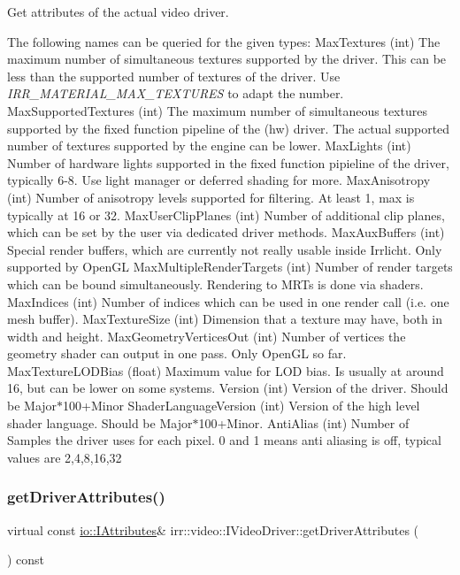Get attributes of the actual video driver. 

The following names can be queried for the given types\+: Max\+Textures (int) The maximum number of simultaneous textures supported by the driver. This can be less than the supported number of textures of the driver. Use {\itshape I\+R\+R\+\_\+\+M\+A\+T\+E\+R\+I\+A\+L\+\_\+\+M\+A\+X\+\_\+\+T\+E\+X\+T\+U\+R\+ES} to adapt the number. Max\+Supported\+Textures (int) The maximum number of simultaneous textures supported by the fixed function pipeline of the (hw) driver. The actual supported number of textures supported by the engine can be lower. Max\+Lights (int) Number of hardware lights supported in the fixed function pipieline of the driver, typically 6-\/8. Use light manager or deferred shading for more. Max\+Anisotropy (int) Number of anisotropy levels supported for filtering. At least 1, max is typically at 16 or 32. Max\+User\+Clip\+Planes (int) Number of additional clip planes, which can be set by the user via dedicated driver methods. Max\+Aux\+Buffers (int) Special render buffers, which are currently not really usable inside Irrlicht. Only supported by Open\+GL Max\+Multiple\+Render\+Targets (int) Number of render targets which can be bound simultaneously. Rendering to M\+R\+Ts is done via shaders. Max\+Indices (int) Number of indices which can be used in one render call (i.\+e. one mesh buffer). Max\+Texture\+Size (int) Dimension that a texture may have, both in width and height. Max\+Geometry\+Vertices\+Out (int) Number of vertices the geometry shader can output in one pass. Only Open\+GL so far. Max\+Texture\+L\+O\+D\+Bias (float) Maximum value for L\+OD bias. Is usually at around 16, but can be lower on some systems. Version (int) Version of the driver. Should be Major$\ast$100+\+Minor Shader\+Language\+Version (int) Version of the high level shader language. Should be Major$\ast$100+\+Minor. Anti\+Alias (int) Number of Samples the driver uses for each pixel. 0 and 1 means anti aliasing is off, typical values are 2,4,8,16,32 \mbox{\label{classirr_1_1video_1_1IVideoDriver_a2b43d2215f2e5aad9b4f92aa635bcc85}} 
\subsubsection{\texorpdfstring{get\+Driver\+Attributes()}{getDriverAttributes()}\hspace{0.1cm}{\footnotesize\ttfamily [2/2]}}
{\footnotesize\ttfamily virtual const \hyperlink{classirr_1_1io_1_1IAttributes}{io\+::\+I\+Attributes}\& irr\+::video\+::\+I\+Video\+Driver\+::get\+Driver\+Attributes (\begin{DoxyParamCaption}{ }\end{DoxyParamCaption}) const\hspace{0.3cm}{\ttfamily [pure virtual]}}



